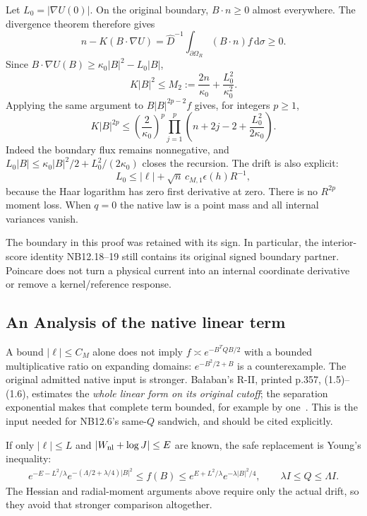 \documentclass[11pt,letterpaper]{article}
\numberwithin{equation}{section}
\theoremstyle{plain}
\theoremstyle{remark}
\newcommand{\dd}{\,\mathrm d}
\newcommand{\Dhat}{\widehat D}
\begin{document}
Let $L_0=|\nabla U(0)|$. On the original boundary, $B\cdot n\ge0$ almost everywhere.
The divergence theorem therefore gives
\[
 n-K(B\cdot\nabla U)
 =\Dhat^{-1}\int_{\partial\Omega_R}(B\cdot n)f\dd\sigma\ge0.
\]
Since $B\cdot\nabla U(B)\ge\kappa_0|B|^2-L_0|B|$,
\begin{equation}
 K|B|^2\le M_2:=\frac{2n}{\kappa_0}+\frac{L_0^2}{\kappa_0^2}.
 \label{eq:moment2}
\end{equation}
Applying the same argument to $B|B|^{2p-2}f$ gives, for integers $p\ge1$,
\begin{equation}
 K|B|^{2p}\le
 \left(\frac2{\kappa_0}\right)^p
 \prod_{j=1}^p\left(n+2j-2+\frac{L_0^2}{2\kappa_0}\right).
 \label{eq:moments}
\end{equation}
Indeed the boundary flux remains nonnegative, and
$L_0|B|\le\kappa_0|B|^2/2+L_0^2/(2\kappa_0)$ closes the recursion.
The drift is also explicit:
\[
 L_0\le|\ell|+\sqrt n\,c_{M,1}\epsilon(h)R^{-1},
\]
because the Haar logarithm has zero first derivative at zero. There is no
$R^{2p}$ moment loss. When $q=0$ the native law is a point mass and all internal
variances vanish.

The boundary in this proof was retained with its sign. In particular, the
interior-score identity NB12.18--19 still contains its original signed boundary
partner. Poincare does not turn a physical current into an internal coordinate
derivative or remove a kernel/reference response.

\subsection{An Analysis of the native linear term}

A bound $|\ell|\le C_M$ alone does not imply
$f\asymp e^{-B^TQB/2}$ with a bounded multiplicative ratio on expanding domains:
$e^{-B^2/2+B}$ is a counterexample. The original admitted native input is stronger.
Ba\l aban's R-II, printed p.357, (1.5)--(1.6), estimates the \emph{whole linear
form on its original cutoff}; the separation exponential makes that complete
term bounded, for example by one~\cite{balabanRII}. This is the input needed for
NB12.6's same-$Q$ sandwich, and should be cited explicitly.

If only $|\ell|\le L$ and $|W_{\rm nl}+\log J|\le E$ are known, the safe
replacement is Young's inequality:
\begin{align*}
 e^{-E-L^2/\lambda}e^{-(\Lambda/2+\lambda/4)|B|^2}
 \le f(B)\le e^{E+L^2/\lambda}e^{-\lambda|B|^2/4},
 \qquad \lambda I\le Q\le\Lambda I.
\end{align*}
The Hessian and radial-moment arguments above require only the actual drift,
so they avoid that stronger comparison altogether.
\end{document}
